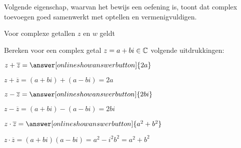 \documentclass{ximera}
\begin{document}

Volgende eigenschap, waarvan het bewijs een oefening is, toont dat complex toevoegen goed samenwerkt met optellen en vermenigvuldigen.


\begin{proposition}\label{eig:complex_toegevoegde_som_product}
	Voor complexe getallen $z$ en $w$ geldt 
	\vspace{-3mm}

\end{proposition}


\begin{exercise} Bereken voor een complex getal  $z=a+bi \in\mathbb{C}$ volgende uitdrukkingen: 
	\begin{xmmulticols}[3]
	\begin{question} $z + \overline{z} = \answer[onlineshowanswerbutton]{2a}$
		\begin{oplossing}\nl
			$ z+ \overline{z} = (a+bi) + (a-bi) = 2a $
		\end{oplossing}
	\end{question}
\begin{question} $z -\overline{z} = \answer[onlineshowanswerbutton]{2bi}$
	\begin{oplossing}\nl
		$ z- \overline{z} = (a+bi) - (a-bi) = 2bi $
	\end{oplossing}
\end{question}
	\begin{question} $z\cdot\overline{z} = \answer[onlineshowanswerbutton]{a^2+b^2}$
		\begin{oplossing}\nl
			$ z\cdot\overline{z} = (a+bi)(a-bi) = a^2- i^2b^2 = a^2+b^2$
		\end{oplossing}
	\end{question}
\end{xmmulticols}
\end{exercise}
\end{document}
